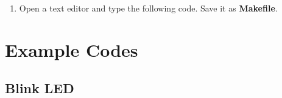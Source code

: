 \documentclass[journal,12pt,twocolumn]{IEEEtran}
\begin{document}
\begin{enumerate}



\item Open a text editor and type the following code. Save it as {\bf Makefile}.

        




\end{enumerate}







\section{Example Codes}


\subsection{Blink LED}
\end{document}
